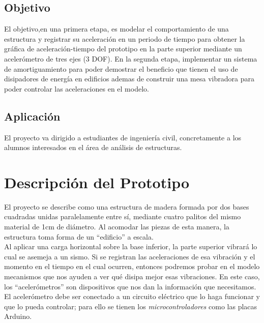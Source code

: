 \documentclass[10pt, a4paper, twocolumn]{article} %
\begin{document}
\subsection{Objetivo}
El objetivo,en una primera etapa, es modelar el comportamiento de una estructura y registrar su aceleración en un periodo de tiempo para obtener la gráfica de aceleración-tiempo del prototipo en la parte superior mediante un acelerómetro de tres ejes (3 DOF). %
En la segunda etapa, implementar un sistema de amortiguamiento para poder demostrar el beneficio que tienen el uso de disipadores de energía en edificios ademas de construir una mesa vibradora para poder controlar las aceleraciones en el modelo.

\subsection{Aplicación}
El proyecto va dirigido a estudiantes de ingeniería civil, concretamente a los alumnos interesados en el área de análisis de estructuras.



\section{Descripción del Prototipo}

El proyecto se describe como una estructura de madera formada por dos bases cuadradas unidas paralelamente entre sí, mediante cuatro palitos del mismo material de 1cm de diámetro. Al acomodar las piezas de esta manera, la estructura toma forma de un ``edificio'' a escala.\\
Al aplicar una carga horizontal sobre la base inferior, la parte superior vibrará lo cual se asemeja a un sismo.
Si se registran las aceleraciones de esa vibración y el momento en el tiempo en el cual ocurren, entonces podremos probar en el modelo mecanismos que nos ayuden a ver qué disipa mejor esas vibraciones.
En este caso, los ``acelerómetros'' son dispositivos que nos dan la información que necesitamos. El acelerómetro debe ser conectado a un circuito eléctrico que lo haga funcionar y que lo pueda controlar; para ello se tienen los \textit{microcontroladores} como las placas Arduino. 


\end{document}
